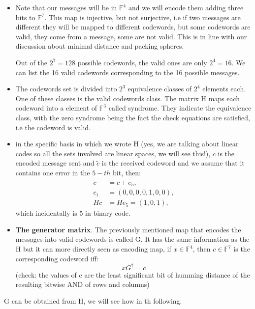 \begin{itemize}
	\item Note that our messages will be in $\mathbb{F}^4$ and we will encode them adding three bits to $\mathbb{F}^7$. This map is injective, but not surjective, i.e if two messages are different they will be mapped to different codewords, but some codewords are valid, they come from a message, some are not valid. This is in line with our discussion about minimal distance and packing spheres.

	Out of the $2^7=128$ possible codewords, the valid ones are only $2^4=16$. We can list the 16 valid codewords corresponding to the 16 possible messages.

	\item The codewords set is divided into $2^3$ equivalence classes of $2^4$ elements each. One of these classes is the valid codewords class. The matrix H maps each codeword into a element of $\mathbb{F}^3$ called syndrome. They indicate the equivalence class, with the zero syndrome being the fact the check equations are satisfied, i.e the codeword is valid.
	\item in the specific basis in which we wrote H (yes, we are talking about linear codes so all the sets involved are linear spaces, we will see this!), $c$ is the encoded message sent and $\tilde{c}$ is the received codeword and we assume that it contains one error in the $5-th$ bit, then:
	\begin{equation}
	\begin{split}
	\tilde{c} &= c + e_5, \\
	e_i &= (0, 0, 0, 0, 1, 0, 0), \\
	Hc &= He_5 = (1, 0, 1),
	\end{split}
	\end{equation}
which incidentally is 5 in binary code.
 \item \textbf{The generator matrix}. The previously mentioned map that encodes the messages into valid codewords is called G. It has the same information as the H but it can more directly seen as encoding map, if $x \in \mathbb{F}^4$, then $c \in \mathbb{F}^7$ is the corresponding codeword iff:
 \begin{equation}
	 x G^\dagger=c
 \end{equation}
(check: the values of c are the least significant bit of humming distance of the resulting bitwise AND of rows and columns)
\end{itemize}
G can be obtained from H, we will see how in th following.


